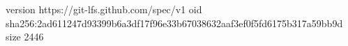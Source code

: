 version https://git-lfs.github.com/spec/v1
oid sha256:2ad611247d93399b6a3df17f96e33b67038632aaf3ef0f5fd6175b317a59bb9d
size 2446

